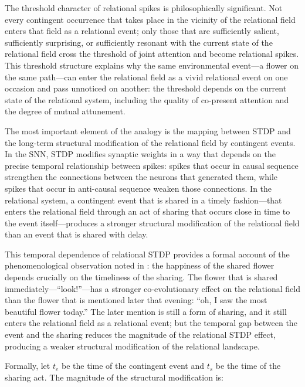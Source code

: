 The threshold character of relational spikes is philosophically significant. Not every contingent occurrence that takes place in the vicinity of the relational field enters that field as a relational event; only those that are sufficiently salient, sufficiently surprising, or sufficiently resonant with the current state of the relational field cross the threshold of joint attention and become relational spikes. This threshold structure explains why the same environmental event---a flower on the same path---can enter the relational field as a vivid relational event on one occasion and pass unnoticed on another: the threshold depends on the current state of the relational system, including the quality of co-present attention and the degree of mutual attunement.

 The most important element of the analogy is the mapping between STDP and the long-term structural modification of the relational field by contingent events. In the SNN, STDP modifies synaptic weights in a way that depends on the precise temporal relationship between spikes: spikes that occur in causal sequence strengthen the connections between the neurons that generated them, while spikes that occur in anti-causal sequence weaken those connections. In the relational system, a contingent event that is shared in a timely fashion---that enters the relational field through an act of sharing that occurs close in time to the event itself---produces a stronger structural modification of the relational field than an event that is shared with delay.

This temporal dependence of relational STDP provides a formal account of the phenomenological observation noted in : the happiness of the shared flower depends crucially on the timeliness of the sharing. The flower that is shared immediately---``look!''---has a stronger co-evolutionary effect on the relational field than the flower that is mentioned later that evening: ``oh, I saw the most beautiful flower today.'' The later mention is still a form of sharing, and it still enters the relational field as a relational event; but the temporal gap between the event and the sharing reduces the magnitude of the relational STDP effect, producing a weaker structural modification of the relational landscape.

Formally, let $t_e$ be the time of the contingent event and $t_s$ be the time of the sharing act. The magnitude of the structural modification is:

